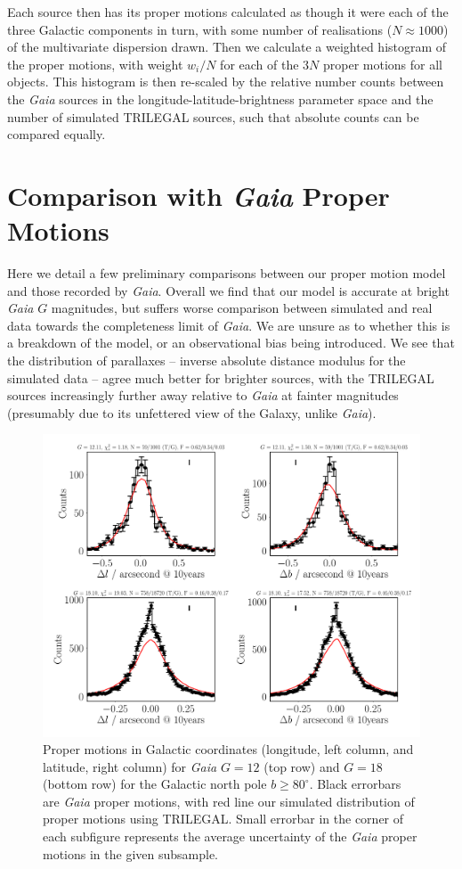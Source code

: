 \documentclass[fleqn,usenatbib]{mnras}
\begin{document}
Each source then has its proper motions calculated as though it were each of the three Galactic components in turn, with some number of realisations ($N \approx 1000$) of the multivariate dispersion drawn.
Then we calculate a weighted histogram of the proper motions, with weight $w_i/N$ for each of the $3N$ proper motions for all objects.
This histogram is then re-scaled by the relative number counts between the \textit{Gaia} sources in the longitude-latitude-brightness parameter space and the number of simulated TRILEGAL sources, such that absolute counts can be compared equally.

\section{Comparison with \textit{Gaia} Proper Motions}
Here we detail a few preliminary comparisons between our proper motion model and those recorded by \textit{Gaia}.
Overall we find that our model is accurate at bright \textit{Gaia} $G$ magnitudes, but suffers worse comparison between simulated and real data towards the completeness limit of \textit{Gaia}.
We are unsure as to whether this is a breakdown of the model, or an observational bias being introduced.
We see that the distribution of parallaxes -- inverse absolute distance modulus for the simulated data -- agree much better for brighter sources, with the TRILEGAL sources increasingly further away relative to \textit{Gaia} at fainter magnitudes (presumably due to its unfettered view of the Galaxy, unlike \textit{Gaia}).

\begin{figure}
    \centering
    \includegraphics[width=\columnwidth]{Plots/plots_pm_gaia_180_85.pdf}
    \caption{Proper motions in Galactic coordinates (longitude, left column, and latitude, right column) for \textit{Gaia} $G = 12$ (top row) and $G=18$ (bottom row) for the Galactic north pole $b \geq 80^\circ$.
    Black errorbars are \textit{Gaia} proper motions, with red line our simulated distribution of proper motions using TRILEGAL.
    Small errorbar in the corner of each subfigure represents the average uncertainty of the \textit{Gaia} proper motions in the given subsample.}
    \label{fig:polepmcomp}
\end{figure}
\end{document}
